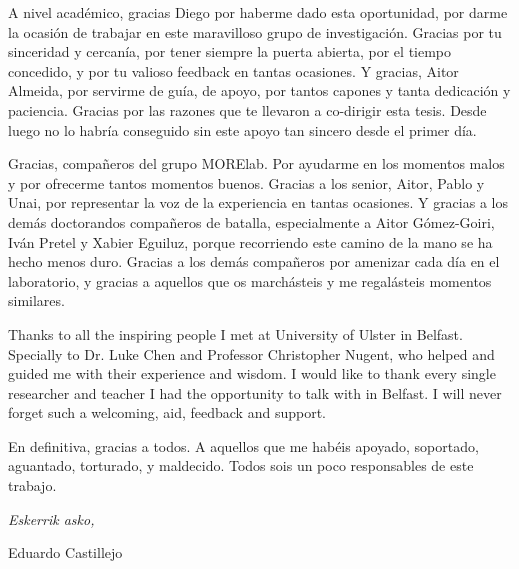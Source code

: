 \begin{acknowledgementslong}
A nivel académico, gracias Diego por haberme dado esta oportunidad, por darme la
ocasión de trabajar en este maravilloso grupo de investigación. Gracias por tu
sinceridad y cercanía, por tener siempre la puerta abierta, por el tiempo
concedido, y por tu valioso feedback en tantas ocasiones. Y gracias, Aitor Almeida,
por servirme de guía, de apoyo, por tantos capones y tanta dedicación y paciencia.
Gracias por las razones que te llevaron a co-dirigir esta tesis. Desde luego no
lo habría conseguido sin este apoyo tan sincero desde el primer día.

Gracias, compañeros del grupo MORElab. Por ayudarme en los momentos malos y por
ofrecerme tantos momentos buenos. Gracias a los senior, Aitor, Pablo y Unai, por
representar la voz de la experiencia en tantas ocasiones. Y gracias a los demás
doctorandos compañeros de batalla, especialmente a Aitor Gómez-Goiri, Iván Pretel
y Xabier Eguiluz, porque recorriendo este camino de la mano se ha hecho menos 
duro. Gracias a los demás compañeros por amenizar cada día en el laboratorio, 
y gracias a aquellos que os marchásteis y me regalásteis momentos similares.

Thanks to all the inspiring people I met at University of Ulster in Belfast.
Specially to Dr. Luke Chen and Professor Christopher Nugent, who helped and
guided me with their experience and wisdom. I would like to thank every single
researcher and teacher I had the opportunity to talk with in Belfast. I will
never forget such a welcoming, aid, feedback and support.

En definitiva, gracias a todos. A aquellos que me habéis apoyado, soportado,
aguantado, torturado, y maldecido. Todos sois un poco responsables de este 
trabajo. 



\begin{flushright}
\textit{Eskerrik asko,}

Eduardo Castillejo

\monthname \ \the\year







\end{flushright}



\end{acknowledgementslong}



